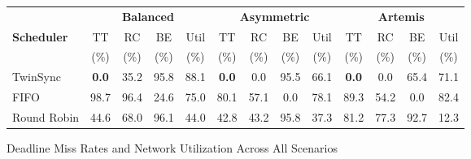 
\begin{figure}[!t]
\centering
\footnotesize
\caption{Deadline Miss Rates and Network Utilization Across All Scenarios}
\label{fig:deadline_miss_combined}
\vspace{0.1cm}
\begin{tabular}{@{}l|cccc|cccc|cccc@{}}
\toprule
& \multicolumn{4}{c|}{\textbf{Balanced}} & \multicolumn{4}{c|}{\textbf{Asymmetric}} & \multicolumn{4}{c}{\textbf{Artemis}} \\
\textbf{Scheduler} & TT & RC & BE & Util & TT & RC & BE & Util & TT & RC & BE & Util \\
& (\%) & (\%) & (\%) & (\%) & (\%) & (\%) & (\%) & (\%) & (\%) & (\%) & (\%) & (\%) \\
\midrule
TwinSync & \textbf{0.0} & 35.2 & 95.8 & 88.1 & \textbf{0.0} & 0.0 & 95.5 & 66.1 & \textbf{0.0} & 0.0 & 65.4 & 71.1 \\
FIFO & 98.7 & 96.4 & 24.6 & 75.0 & 80.1 & 57.1 & 0.0 & 78.1 & 89.3 & 54.2 & 0.0 & 82.4 \\
Round Robin & 44.6 & 68.0 & 96.1 & 44.0 & 42.8 & 43.2 & 95.8 & 37.3 & 81.2 & 77.3 & 92.7 & 12.3 \\
\bottomrule
\end{tabular}
\vspace{-0.3cm}
\end{figure}

